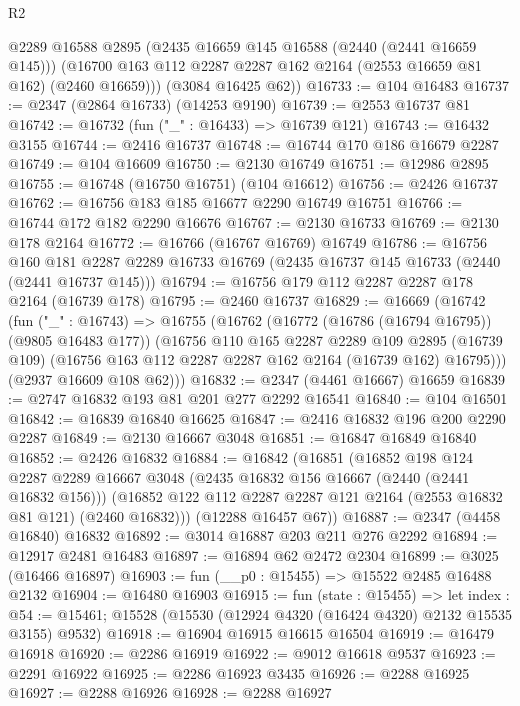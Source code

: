 \begin{lexlean}{R2}
\begin{coremodule}
        @2289
        @16588
        @2895
        (@2435 @16659 @145 @16588 (@2440 (@2441 @16659 @145)))
        (@16700 @163 @112 @2287 @2287 @162 @2164 (@2553 @16659 @81 @162) (@2460 @16659)))
      (@3084 @16425 @62))
@16733 := @104 @16483
@16737 := @2347 (@2864 @16733) (@14253 @9190)
@16739 := @2553 @16737 @81
@16742 := @16732 (fun ("_" : @16433) => @16739 @121)
@16743 := @16432 @3155
@16744 := @2416 @16737
@16748 := @16744 @170 @186 @16679 @2287
@16749 := @104 @16609
@16750 := @2130 @16749
@16751 := @12986 @2895
@16755 := @16748 (@16750 @16751) (@104 @16612)
@16756 := @2426 @16737
@16762 := @16756 @183 @185 @16677 @2290 @16749 @16751
@16766 := @16744 @172 @182 @2290 @16676
@16767 := @2130 @16733
@16769 := @2130 @178 @2164
@16772 := @16766 (@16767 @16769) @16749
@16786 := @16756
    @160
    @181
    @2287
    @2289
    @16733
    @16769
    (@2435 @16737 @145 @16733 (@2440 (@2441 @16737 @145)))
@16794 := @16756 @179 @112 @2287 @2287 @178 @2164 (@16739 @178)
@16795 := @2460 @16737
@16829 := @16669
    (@16742
      (fun ("_" : @16743) =>
      @16755
        (@16762
          (@16772 (@16786 (@16794 @16795)) (@9805 @16483 @177))
          (@16756
            @110
            @165
            @2287
            @2289
            @109
            @2895
            (@16739 @109)
            (@16756 @163 @112 @2287 @2287 @162 @2164 (@16739 @162) @16795)))
        (@2937 @16609 @108 @62)))
@16832 := @2347 (@4461 @16667) @16659
@16839 := @2747 @16832 @193 @81 @201 @277 @2292 @16541
@16840 := @104 @16501
@16842 := @16839 @16840 @16625
@16847 := @2416 @16832 @196 @200 @2290 @2287
@16849 := @2130 @16667 @3048
@16851 := @16847 @16849 @16840
@16852 := @2426 @16832
@16884 := @16842
    (@16851
      (@16852
        @198
        @124
        @2287
        @2289
        @16667
        @3048
        (@2435 @16832 @156 @16667 (@2440 (@2441 @16832 @156)))
        (@16852 @122 @112 @2287 @2287 @121 @2164 (@2553 @16832 @81 @121) (@2460 @16832)))
      (@12288 @16457 @67))
@16887 := @2347 (@4458 @16840) @16832
@16892 := @3014 @16887 @203 @211 @276 @2292
@16894 := @12917 @2481 @16483
@16897 := @16894 @62 @2472 @2304
@16899 := @3025 (@16466 @16897)
@16903 := fun (__p0 : @15455) => @15522 @2485 @16488 @2132
@16904 := @16480 @16903
@16915 := fun (state : @15455) =>
  let index : @54 := @15461; @15528 (@15530 (@12924 @4320 (@16424 @4320) @2132 @15535 @3155) @9532)
@16918 := @16904 @16915 @16615 @16504
@16919 := @16479 @16918
@16920 := @2286 @16919
@16922 := @9012 @16618 @9537
@16923 := @2291 @16922
@16925 := @2286 @16923 @3435
@16926 := @2288 @16925
@16927 := @2288 @16926
@16928 := @2288 @16927

\end{coremodule}
\end{lexlean}
